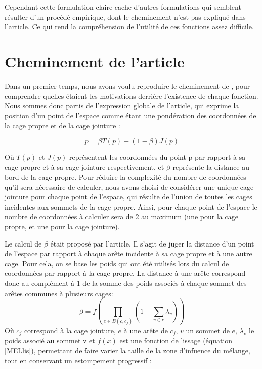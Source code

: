 Cependant cette formulation claire cache d'autres formulations qui
semblent résulter d'un procédé empirique, dont le cheminement n'est
pas expliqué dans l'article. Ce qui rend la compréhension de l'utilité
de ces fonctions assez difficile.

\section{Cheminement de l'article}
Dans un premier temps, nous avons voulu reproduire le cheminement de
\cite{GPCP13}, pour comprendre quelles étaient les motivations
derrière l'existence de chaque fonction. Nous sommes donc partis de
l'expression globale de l'article, qui exprime la position d'un point
de l'espace comme étant une pondération des coordonnées de la cage
propre et de la cage jointure :

\begin{equation}
  p = \beta T(p)  + (1 - \beta) J(p) 
  \label{MELgen}
\end{equation}

Où $T(p)$ et $J(p)$ représentent les coordonnées du point p par
rapport à sa cage propre et à sa cage jointure respectivement, et
$\beta$ représente la distance au bord de la cage propre. Pour réduire
la complexité du nombre de coordonnées qu'il sera nécessaire de
calculer, nous avons choisi de considérer une unique cage jointure
pour chaque point de l'espace, qui résulte de l'union de toutes les
cages incidentes aux sommets de la cage propre. Ainsi, pour chaque
point de l'espace le nombre de coordonnées à calculer sera de 2 au
maximum (une pour la cage propre, et une pour la cage jointure).

Le calcul de $\beta$ était proposé par l'article. Il s'agit de juger
la distance d'un point de l'espace par rapport à chaque arête
incidente à sa cage propre et à une autre cage. Pour cela, on se base
les poids qui ont été utilisés lors du calcul de coordonnées par
rapport à la cage propre. La distance à une arête correspond donc au
complément à 1 de la somme des poids associés à chaque sommet des
arêtes communes à plusieurs cages:
\begin{equation}
  \beta = f(\prod_{e \in B(c,c_j)} (1 - \sum_{v \in e} \lambda_v))
\end{equation}
Où $c_j$ correspond à la cage jointure, $e$ à une arête de $c_j$, $v$
un sommet de $e$, $\lambda_v$ le poids associé au sommet v et $f(x)$
est une fonction de lissage (équation \ref{MELlis}), permettant de
faire varier la taille de la zone d'infuence du mélange, tout en
conservant un estompement progressif :

